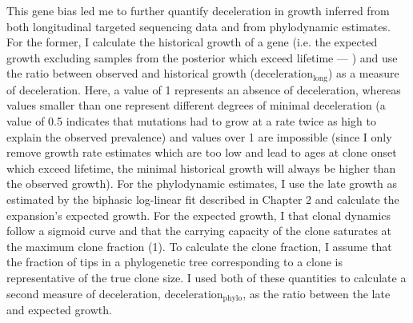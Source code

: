 \begin{figure}[!ht]
	\label{fig:exceeds-within-lifetime}
\end{figure}

\begin{figure}[!ht]
	\label{fig:fraction-clones-exceeding-lifetime}
\end{figure}

This gene bias led me to further quantify deceleration in growth inferred from both longitudinal targeted sequencing data and from phylodynamic estimates. For the former, I calculate the historical growth of a gene (i.e. the expected growth excluding samples from the posterior which exceed lifetime --- ) and use the ratio between observed and historical growth ($\mathrm{deceleration}_{\mathrm{long}}$) as a measure of deceleration. Here, a value of 1 represents an absence of deceleration, whereas values smaller than one represent different degrees of minimal deceleration (a value of 0.5 indicates that mutations had to grow at a rate twice as high to explain the observed prevalence) and values over 1 are impossible (since I only remove growth rate estimates which are too low and lead to ages at clone onset which exceed lifetime, the minimal historical growth will always be higher than the observed growth). For the phylodynamic estimates, I use the late growth as estimated by the biphasic log-linear fit described in Chapter 2 and calculate the expansion's expected growth. For the expected growth, I that clonal dynamics follow a sigmoid curve and that the carrying capacity of the clone saturates at the maximum clone fraction (1). To calculate the clone fraction, I assume that the fraction of tips in a phylogenetic tree corresponding to a clone is representative of the true clone size. I used both of these quantities to calculate a second measure of deceleration, $\mathrm{deceleration}_{\mathrm{phylo}}$, as the ratio between the late and expected growth.

